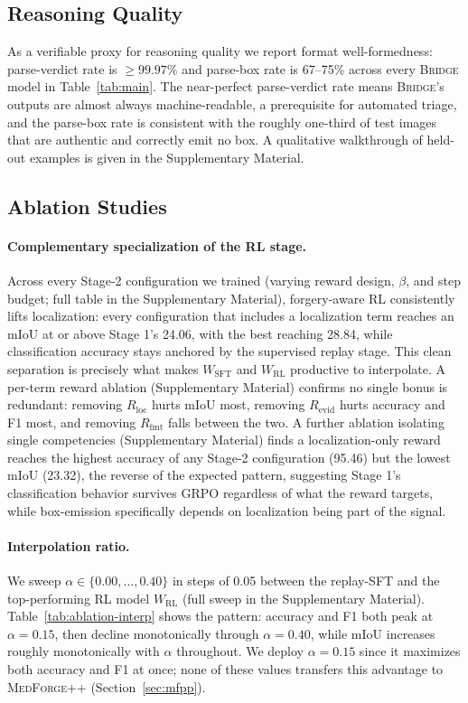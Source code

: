 \documentclass[10pt,twocolumn,letterpaper]{article}
\newcommand{\bridge}{\textsc{Bridge}}
\newcommand{\medforgepp}{\textsc{MedForge++}}
\begin{document}
\subsection{Reasoning Quality}
\label{sec:reasoning}
As a verifiable proxy for reasoning quality we report format well-formedness: parse-verdict rate is $\ge 99.97\%$ and parse-box rate is 67--75\% across every \bridge{} model in Table~\ref{tab:main}. The near-perfect parse-verdict rate means \bridge{}'s outputs are almost always machine-readable, a prerequisite for automated triage, and the parse-box rate is consistent with the roughly one-third of test images that are authentic and correctly emit no box. A qualitative walkthrough of held-out examples is given in the Supplementary Material.

\subsection{Ablation Studies}
\label{sec:ablation}
\paragraph{Complementary specialization of the RL stage.} Across every Stage-2 configuration we trained (varying reward design, $\beta$, and step budget; full table in the Supplementary Material), forgery-aware RL consistently lifts localization: every configuration that includes a localization term reaches an mIoU at or above Stage 1's 24.06, with the best reaching 28.84, while classification accuracy stays anchored by the supervised replay stage. This clean separation is precisely what makes $W_{\mathrm{SFT}}$ and $W_{\mathrm{RL}}$ productive to interpolate. A per-term reward ablation (Supplementary Material) confirms no single bonus is redundant: removing $R_{\mathrm{loc}}$ hurts mIoU most, removing $R_{\mathrm{evid}}$ hurts accuracy and F1 most, and removing $R_{\mathrm{fmt}}$ falls between the two. A further ablation isolating single competencies (Supplementary Material) finds a localization-only reward reaches the highest accuracy of any Stage-2 configuration (95.46) but the lowest mIoU (23.32), the reverse of the expected pattern, suggesting Stage 1's classification behavior survives GRPO regardless of what the reward targets, while box-emission specifically depends on localization being part of the signal.

\paragraph{Interpolation ratio.} We sweep $\alpha \in \{0.00, \ldots, 0.40\}$ in steps of 0.05 between the replay-SFT and the top-performing RL model $W_{\mathrm{RL}}$ (full sweep in the Supplementary Material). Table~\ref{tab:ablation-interp} shows the pattern: accuracy and F1 both peak at $\alpha{=}0.15$, then decline monotonically through $\alpha{=}0.40$, while mIoU increases roughly monotonically with $\alpha$ throughout. We deploy $\alpha{=}0.15$ since it maximizes both accuracy and F1 at once; none of these values transfers this advantage to \medforgepp{} (Section~\ref{sec:mfpp}).
\end{document}
